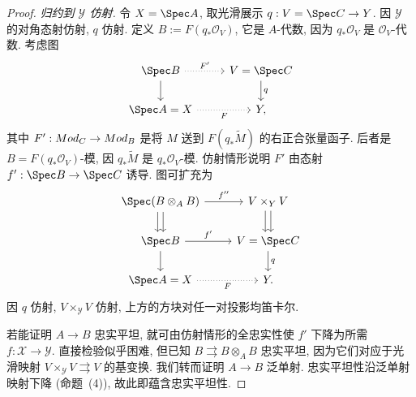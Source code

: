 \begin{proof}
\emph{归约到 $\mathcal Y$ 仿射.} 令 $\mathcal X=\Spec A$, 取光滑展示 $q:V=\Spec C\to\mathcal Y$. 因 $\mathcal Y$ 的对角态射仿射, $q$ 仿射. 定义 $B:=F(q_*\mathcal O_V)$, 它是 $A$-代数, 因为 $q_*\mathcal O_V$ 是 $\mathcal O_V$-代数. 考虑图
\begin{align*}
\begin{tikzcd}[ampersand replacement=\&]
\Spec B\arrow[r,dotted,"{F'}"]\arrow[d]\&V=\Spec C\arrow[d,"{q}"]\\
\Spec A=\mathcal X\arrow[r,dotted,"{F}"']\&\mathcal Y,
\end{tikzcd}
\end{align*}
其中 $F':Mod_C\to Mod_B$ 是将 $M$ 送到 $F(q_*\widetilde M)$ 的右正合张量函子. 后者是 $B=F(q_*\mathcal O_V)$-模, 因 $q_*\widetilde M$ 是 $q_*\mathcal O_V$-模. 仿射情形说明 $F'$ 由态射 $f':\Spec B\to\Spec C$ 诱导. 图可扩充为
\begin{align*}
\begin{tikzcd}[ampersand replacement=\&]
\Spec(B\otimes_AB)\arrow[r,"{f''}"]\arrow[d,shift left]\arrow[d,shift right]\&V\times_{\mathcal Y}V\arrow[d,shift left]\arrow[d,shift right]\\
\Spec B\arrow[r,"{f'}"]\arrow[d]\&V=\Spec C\arrow[d,"{q}"]\\
\Spec A=\mathcal X\arrow[r,dotted,"{F}"']\&\mathcal Y.
\end{tikzcd}
\end{align*}
因 $q$ 仿射, $V\times_{\mathcal Y}V$ 仿射, 上方的方块对任一对投影均笛卡尔.

若能证明 $A\to B$ 忠实平坦, 就可由仿射情形的全忠实性使 $f'$ 下降为所需 $f:\mathcal X\to\mathcal Y$. 直接检验似乎困难, 但已知 $B\rightrightarrows B\otimes_AB$ 忠实平坦, 因为它们对应于光滑映射 $V\times_{\mathcal Y}V\rightrightarrows V$ 的基变换. 我们转而证明 $A\to B$ 泛单射. 忠实平坦性沿泛单射映射下降 (命题~(4)), 故此即蕴含忠实平坦性.


\end{proof}
